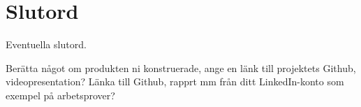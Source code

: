 \section*{Slutord}
Eventuella slutord.

Berätta något om produkten ni konstruerade, ange en länk till projektets Github\cite{Eklund:2}, videopresentation?
Länka till Github, rapprt mm från ditt LinkedIn-konto som exempel på arbetsprover?\cite{DUMMY:1}
